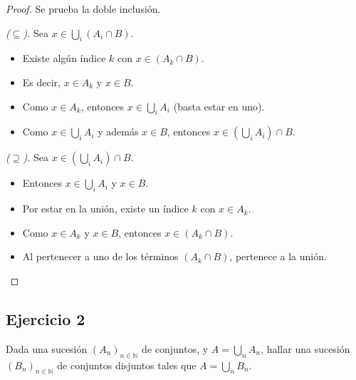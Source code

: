 \documentclass[11pt, a4paper]{article}
\begin{document}
\begin{proof}
Se prueba la doble inclusión.

\textit{($\subseteq$).} Sea $x \in \bigcup_{i} (A_i \cap B)$.
\begin{itemize}
    \item Existe algún índice $k$ con $x \in (A_k \cap B)$.
    \item Es decir, $x \in A_k$ y $x \in B$.
    \item Como $x \in A_k$, entonces $x \in \bigcup_{i} A_i$ (basta estar en uno).
    \item Como $x \in \bigcup_{i} A_i$ y además $x \in B$, entonces $x \in (\bigcup_{i} A_i) \cap B$.
\end{itemize}

\textit{($\supseteq$).} Sea $x \in (\bigcup_{i} A_i) \cap B$.
\begin{itemize}
    \item Entonces $x \in \bigcup_{i} A_i$ y $x \in B$.
    \item Por estar en la unión, existe un índice $k$ con $x \in A_k$.
    \item Como $x \in A_k$ y $x \in B$, entonces $x \in (A_k \cap B)$.
    \item Al pertenecer a uno de los términos $(A_k \cap B)$, pertenece a la unión.
\end{itemize}
\end{proof}

\subsection*{Ejercicio 2}

Dada una sucesión $(A_{n})_{n\in\mathbb{N}}$ de conjuntos, y $A=\bigcup_{n}A_{n}$, hallar una
sucesión $(B_{n})_{n\in\mathbb{N}}$ de conjuntos disjuntos tales que $A=\bigcup_{n}B_{n}$.
\end{document}
